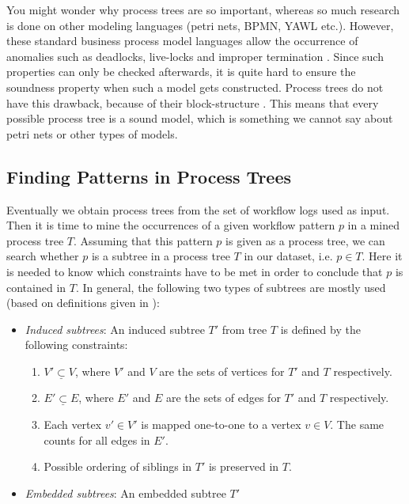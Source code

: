 \documentclass[a4paper,11pt]{article}
\begin{document}
You might wonder why process trees are so important, whereas so much research \cite{VanderAalst2003Survey} is done on other modeling languages (petri nets, BPMN, YAWL etc.). However, these standard business process model languages allow the occurrence of anomalies such as deadlocks, live-locks and improper termination \cite{Buijs2012ProcessTrees}. Since such properties can only be checked afterwards, it is quite hard to ensure the soundness property when such a model gets constructed. Process trees do not have this drawback, because of their block-structure \cite{2009DifferenceBetweenGraphAndBlockStructuredLanguages}. This means that every possible process tree is a sound model, which is something we cannot say about petri nets or other types of models.

\subsection{Finding Patterns in Process Trees}
\label{section:occurrences}
Eventually we obtain process trees from the set of workflow logs used as input. Then it is time to mine the occurrences of a given workflow pattern $p$ in a mined process tree $T$. Assuming that this pattern $p$ is given as a process tree, we can search whether $p$ is a subtree in a process tree $T$ in our dataset, i.e. $p \in T$. Here it is needed to know which constraints have to be met in order to conclude that $p$ is contained in $T$. In general, the following two types of subtrees are mostly used (based on definitions given in \cite{FREQT2010Survey}):
\begin{itemize}
\item \textit{Induced subtrees}: An induced subtree $T'$ from tree $T$ is defined by the following constraints:
\begin{enumerate}
\item $V' \underline{\subset} V$, where $V'$ and $V$ are the sets of vertices for $T'$ and $T$ respectively.
\item $E' \underline{\subset} E$, where $E'$ and $E$ are the sets of edges for $T'$ and $T$ respectively.
\item Each vertex $v' \in V'$ is mapped one-to-one to a vertex $v \in V$. The same counts for all edges in $E'$.
\item Possible ordering of siblings in $T'$ is preserved in $T$.
\end{enumerate}
\item \textit{Embedded subtrees}: An embedded subtree $T'$ 
\end{itemize}
\end{document}
